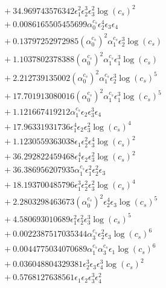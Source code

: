 \documentclass[10pt]{article}
\begin{document}
\begin{align*}
&{}  + 34.969743576342 \epsilon_{1}^{2} \epsilon_{2}^{3} \epsilon_{3}^{2} \log{\left(c_{s} \right)}^{2} \\
&{}  + 0.0086165505455699 \alpha_{0}^{c_s} \epsilon_{2}^{4} \epsilon_{3} \epsilon_{4} \\
&{}  + 0.13797252972985 \left(\alpha_{0}^{c_s}\right)^{2} \alpha_{1}^{c_s} \epsilon_{2}^{3} \log{\left(c_{s} \right)} \\
&{}  + 1.1037802378388 \left(\alpha_{0}^{c_s}\right)^{2} \alpha_{1}^{c_s} \epsilon_{1}^{3} \log{\left(c_{s} \right)} \\
&{}  + 2.212739135002 \left(\alpha_{0}^{c_s}\right)^{2} \alpha_{1}^{c_s} \epsilon_{2}^{3} \log{\left(c_{s} \right)}^{5} \\
&{}  + 17.701913080016 \left(\alpha_{0}^{c_s}\right)^{2} \alpha_{1}^{c_s} \epsilon_{1}^{3} \log{\left(c_{s} \right)}^{5} \\
&{}  + 1.121667419212 \alpha_{1}^{c_s} \epsilon_{2} \epsilon_{3}^{3} \epsilon_{4} \\
&{}  + 17.96331931736 \epsilon_{1}^{4} \epsilon_{2} \epsilon_{3}^{2} \log{\left(c_{s} \right)}^{4} \\
&{}  + 1.1230559363038 \epsilon_{1} \epsilon_{2}^{2} \epsilon_{3}^{4} \log{\left(c_{s} \right)}^{2} \\
&{}  + 36.292822459468 \epsilon_{1}^{4} \epsilon_{2} \epsilon_{3}^{2} \log{\left(c_{s} \right)}^{2} \\
&{}  + 36.386956207935 \alpha_{1}^{c_s} \epsilon_{1}^{2} \epsilon_{2}^{2} \epsilon_{3} \\
&{}  + 18.193700485796 \epsilon_{1}^{3} \epsilon_{2}^{2} \epsilon_{3}^{2} \log{\left(c_{s} \right)}^{4} \\
&{}  + 2.2803298463673 \left(\alpha_{0}^{c_s}\right)^{2} \epsilon_{2}^{4} \epsilon_{3} \log{\left(c_{s} \right)}^{5} \\
&{}  + 4.580693010689 \epsilon_{1}^{2} \epsilon_{2}^{2} \epsilon_{3}^{3} \log{\left(c_{s} \right)}^{5} \\
&{}  + 0.0022387517035344 \alpha_{3}^{c_s} \epsilon_{2}^{2} \epsilon_{3} \log{\left(c_{s} \right)}^{6} \\
&{}  + 0.0044775034070689 \alpha_{1}^{c_s} \alpha_{3}^{c_s} \epsilon_{1} \log{\left(c_{s} \right)}^{6} \\
&{}  + 0.036048804329381 \epsilon_{2}^{3} \epsilon_{3} \epsilon_{4}^{3} \log{\left(c_{s} \right)}^{2} \\
&{}  + 0.5768127638561 \epsilon_{1} \epsilon_{2} \epsilon_{3}^{3} \epsilon_{4}^{2} \\

\end{align*}
\end{document}
